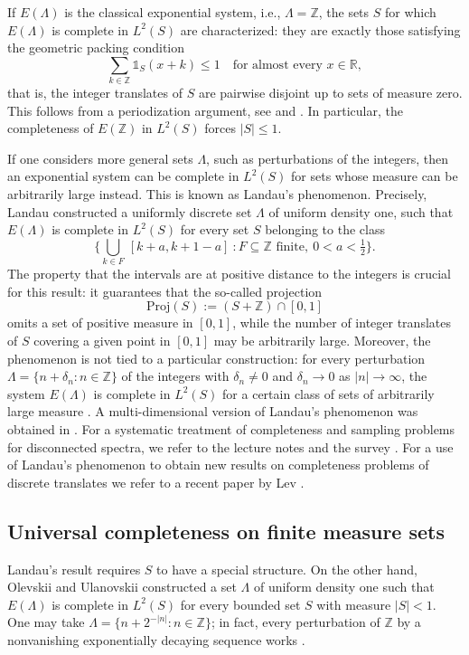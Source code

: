 \documentclass[reqno,a4paper,12pt]{amsart}
\numberwithin{equation}{section}
\def\Z{{\mathbb Z}}
\def\R{{\mathbb R}}
\newcommand\1{\mathds{1}}
\begin{document}
If $E(\Lambda)$ is the classical exponential system, i.e., $\Lambda = \Z$, the sets $S$ for which $E(\Lambda)$ is complete in $L^2(S)$ are characterized: they are exactly those satisfying the geometric packing condition
$$
\sum_{k \in \Z} \1_S(x+k) \leq 1 \quad \text{for almost every } x \in \R,
$$
that is, the integer translates of $S$ are pairwise disjoint up to sets of measure zero. This follows from a periodization argument, see \cite[Section 8]{OlevskiiUlanovskii2020} and \cite{de2019three}. In particular, the completeness of $E(\Z)$ in $L^2(S)$ forces $|S| \leq 1$.

If one considers more general sets $\Lambda$, such as perturbations of the integers, then an exponential system can be complete in $L^2(S)$ for sets whose measure can be arbitrarily large instead. This is known as Landau's phenomenon. Precisely, Landau \cite{Landau1964} constructed a uniformly discrete set $\Lambda$ of uniform density one, such that $E(\Lambda)$ is complete in $L^2(S)$ for every set $S$ belonging to the class
$$
\Big \{ \bigcup_{k \in F} \, [k+a, k+1-a] \ :  F \subseteq \Z \text{ finite}, \ 0 < a < \tfrac12 \Big \}.
$$
The property that the intervals are at positive distance to the integers is crucial for this result: it guarantees that the so-called projection
$$
\mathrm{Proj}(S) := (S+\Z) \cap [0,1]
$$
omits a set of positive measure in $[0,1]$, while the number of integer translates of $S$ covering a given point in $[0,1]$ may be arbitrarily large. Moreover, the phenomenon is not tied to a particular construction: for every perturbation $\Lambda = \{ n + \delta_n : n \in \Z\}$ of the integers with $\delta_n \neq 0$ and $\delta_n \to 0$ as $|n| \to \infty$, the system $E(\Lambda)$ is complete in $L^2(S)$ for a certain class of sets of arbitrarily large measure \cite{Olevskii1997,bruna2006completeness}. A multi-dimensional version of Landau's phenomenon was obtained in \cite{Ulanovskii2001}. For a systematic treatment of completeness and sampling problems for disconnected spectra, we refer to the lecture notes \cite{OlevskiiUlanovskii2016} and the survey \cite{OlevskiiUlanovskii2020}. For a use of Landau's phenomenon to obtain new results on completeness problems of discrete translates we refer to a recent paper by Lev \cite{lev2025completeness}.

\subsection{Universal completeness on finite measure sets}
Landau's result requires $S$ to have a special structure. On the other hand, Olevskii and Ulanovskii \cite{OlevskiiUlanovskii2008} constructed a set $\Lambda$ of uniform density one such that $E(\Lambda)$ is complete in $L^2(S)$ for every bounded set $S$ with measure $|S| < 1$. One may take $\Lambda = \{ n + 2^{-|n|} : n \in \Z \}$; in fact, every perturbation of $\Z$ by a nonvanishing exponentially decaying sequence works \cite[Theorem~3.1]{OlevskiiUlanovskii2008}.
\end{document}
